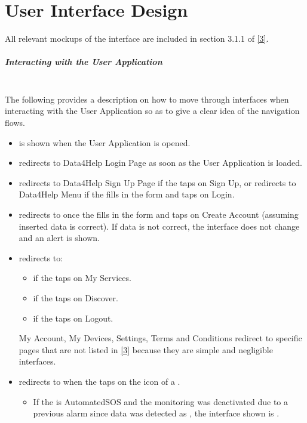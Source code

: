 \documentclass[../DD.tex]{subfiles}
\begin{document}
 \chapter{User Interface Design}
	All relevant mockups of the  interface are included in section 3.1.1 of \hyperref[ref:3]{[3]}.
	\paragraph{Interacting with the User Application}\mbox{}\\
	\indent The following provides a description on how to move through interfaces when interacting with the User Application so as to give a clear idea of the navigation flows.
	\begin{itemize}
		\item {} is shown when the User Application is opened.
		\item {} redirects to Data4Help Login Page as soon as the User Application is loaded.
		\item {} redirects to Data4Help Sign Up Page if the  taps on Sign Up, or redirects to Data4Help Menu if the  fills in the form and taps on Login.
		\item {}redirects to  once the  fills in the form and taps on Create Account (assuming inserted data is correct). If data is not correct, the interface does not change and an alert is shown.
		\item {} redirects to:
			\begin{itemize}
				\item {} if the  taps on My Services.
				\item {} if the  taps on Discover.
				\item {} if the  taps on Logout.				
			\end{itemize}
			My Account, My Devices, Settings, Terms and Conditions redirect to specific pages that are not listed in \hyperref[ref:3]{[3]} because they are simple and negligible interfaces. 
		\item {} redirects to  when the  taps on the icon of a .
			\begin{itemize}
				\item If the  is AutomatedSOS and the monitoring was deactivated due to a previous alarm since data was detected as , the interface shown is .

\end{itemize}
\end{itemize}
\end{document}
